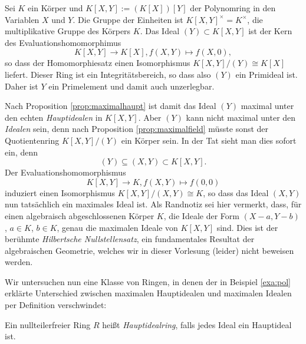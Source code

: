 \documentclass{book}
\begin{document}
\begin{exa}
    \label{exa:pol}
    Sei $K$ ein Körper und $K[X,Y] := (K[X])[Y]$ der Polynomring in den Variablen $X$ und
    $Y$. Die Gruppe der Einheiten ist $K[X,Y]^{\times} = K^{\times}$, die
    multiplikative Gruppe des Körpers $K$. Das Ideal $(Y) \subset K[X,Y]$ ist
    der Kern des Evaluationshomomorphimus
    \[
        K[X,Y] \to K[X], f(X,Y) \mapsto f(X,0),
    \]
    so dass der Homomorphiesatz einen Isomorphismus $K[X,Y]/(Y) \cong K[X]$
    liefert. Dieser Ring ist ein Integritätsbereich, so dass also $(Y)$ ein
    Primideal ist. Daher ist $Y$ ein Primelement und damit auch unzerlegbar. 

    Nach Proposition \ref{prop:maximalhaupt} ist damit das Ideal $(Y)$ maximal
    unter den echten \emph{Hauptidealen} in $K[X,Y]$. Aber $(Y)$ kann nicht
    maximal unter den \emph{Idealen} sein, denn nach Proposition
    \ref{prop:maximalfield} müsste sonst der Quotientenring $K[X,Y]/(Y)$ ein
    Körper sein. 
%
    In der Tat sieht man dies sofort ein, denn
    \[
        (Y) \subseteq (X,Y) \subset K[X,Y].
    \]
    Der Evaluationshomomorphismus
    \[
        K[X,Y] \to K, f(X,Y) \mapsto f(0,0)
    \]
    induziert einen Isomorphismus $K[X,Y]/(X,Y) \cong K$, so dass das Ideal
    $(X,Y)$ nun tatsächlich ein maximales Ideal ist. 
%
    Als Randnotiz sei hier vermerkt, dass, für einen algebraisch
    abgeschlossenen Körper $K$, die Ideale der Form $(X-a,Y-b)$, $a \in K$, $b
    \in K$, genau die maximalen Ideale von $K[X,Y]$ sind. Dies ist der berühmte
    \emph{Hilbertsche Nullstellensatz}, ein fundamentales Resultat der
    algebraischen Geometrie, welches wir in dieser Vorlesung (leider) nicht
    beweisen werden.
\end{exa}

Wir untersuchen nun eine Klasse von Ringen, in denen der in Beispiel
\ref{exa:pol} erklärte Unterschied zwischen maximalen Hauptidealen und
maximalen Idealen per Definition verschwindet:

\begin{defi}
    \label{defi:hauptidealring}
    Ein nullteilerfreier Ring $R$ heißt \emph{Hauptidealring}, falls jedes Ideal ein Hauptideal ist. 
\end{defi}
    
\end{document}
